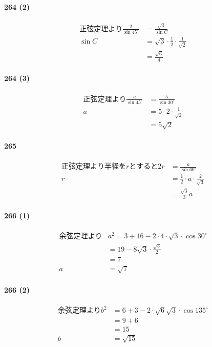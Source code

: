 \documentclass[fleqn,a4j,dvipdfmx,uplatex,twocolumn]{jsarticle}
\begin{document}
\paragraph{264 (2)}
\begin{align*}
正弦定理より
\frac{2}{\sin 45^{\circ}} & =\frac{\sqrt{3}}{\sin C} \\
\sin C & =\sqrt{3} \cdot \frac{1}{2} \cdot \frac{1}{\sqrt{2}} \\
& =\frac{\sqrt{6}}{4}
\end{align*}

\paragraph{264 (3)}
\begin{align*}
正弦定理より
\frac{a}{\sin 45^{\circ}} & =\frac{5}{\sin 30^{\circ}} \\
a & =5 \cdot 2 \cdot \frac{1}{\sqrt{2}} \\
& =5 \sqrt{2}
\end{align*}

\paragraph{265}
\begin{align*}
正弦定理より 半径をrとすると
2 r & =\frac{a}{\sin 60^{\circ}} \\
r & =\frac{1}{2} \cdot a \cdot \frac{2}{\sqrt{3}} \\
& =\frac{\sqrt{3}}{3} a
\end{align*}

\paragraph{266 (1)}
\begin{align*}
余弦定理より
& a^2=3+16-2 \cdot 4 \cdot \sqrt{3} \cdot \cos 30^{\circ} \\
& =19-8 \sqrt{3} \cdot \frac{\sqrt{3}}{2} \\
& =7 \\
a & =\sqrt{7}
\end{align*}

\paragraph{266 (2)}
\begin{align*}
余弦定理より
b^2 & =6+3-2 \cdot \sqrt{6} \sqrt{3} \cdot \cos 135^{\circ} \\
& =9+6 \\
& =15 \\
b & =\sqrt{15}
\end{align*}
\end{document}
